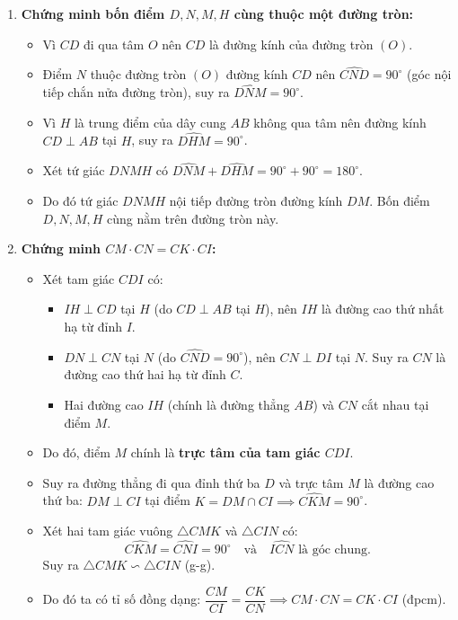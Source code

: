 \begin{ex}
{\begin{enumerate}[label=\textbf{\alph*)}]
    \item \textbf{Chứng minh bốn điểm $D, N, M, H$ cùng thuộc một đường tròn:}
    \begin{itemize}
        \item Vì $CD$ đi qua tâm $O$ nên $CD$ là đường kính của đường tròn $(O)$.
        \item Điểm $N$ thuộc đường tròn $(O)$ đường kính $CD$ nên $\widehat{CND} = 90^\circ$ (góc nội tiếp chắn nửa đường tròn), suy ra $\widehat{DNM} = 90^\circ$.
        \item Vì $H$ là trung điểm của dây cung $AB$ không qua tâm nên đường kính $CD \perp AB$ tại $H$, suy ra $\widehat{DHM} = 90^\circ$.
        \item Xét tứ giác $DNMH$ có $\widehat{DNM} + \widehat{DHM} = 90^\circ + 90^\circ = 180^\circ$.
        \item Do đó tứ giác $DNMH$ nội tiếp đường tròn đường kính $DM$. Bốn điểm $D, N, M, H$ cùng nằm trên đường tròn này.
    \end{itemize}

    \item \textbf{Chứng minh $CM \cdot CN = CK \cdot CI$:}
    \begin{itemize}
        \item Xét tam giác $CDI$ có:
        \begin{itemize}
            \item $IH \perp CD$ tại $H$ (do $CD \perp AB$ tại $H$), nên $IH$ là đường cao thứ nhất hạ từ đỉnh $I$.
            \item $DN \perp CN$ tại $N$ (do $\widehat{CND} = 90^\circ$), nên $CN \perp DI$ tại $N$. Suy ra $CN$ là đường cao thứ hai hạ từ đỉnh $C$.
            \item Hai đường cao $IH$ (chính là đường thẳng $AB$) và $CN$ cắt nhau tại điểm $M$.
        \end{itemize}
        \item Do đó, điểm $M$ chính là \textbf{trực tâm của tam giác $CDI$}.
        \item Suy ra đường thẳng đi qua đỉnh thứ ba $D$ và trực tâm $M$ là đường cao thứ ba: $DM \perp CI$ tại điểm $K = DM \cap CI \implies \widehat{CKM} = 90^\circ$.
        \item Xét hai tam giác vuông $\triangle CMK$ và $\triangle CIN$ có:
        \[
        \widehat{CKM} = \widehat{CNI} = 90^\circ \quad \text{và} \quad \widehat{ICN} \text{ là góc chung.}
        \]
        Suy ra $\triangle CMK \backsim \triangle CIN$ (g-g).
        \item Do đó ta có tỉ số đồng dạng: $\dfrac{CM}{CI} = \dfrac{CK}{CN} \implies CM \cdot CN = CK \cdot CI$ (đpcm).
    \end{itemize}


\end{enumerate}}
\end{ex}
